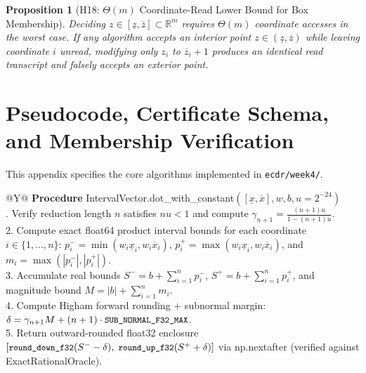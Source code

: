 \documentclass[11pt,oneside,a4paper]{report}
\newcommand{\R}{\mathbb{R}}
\newcommand{\abs}[1]{\left\lvert #1\right\rvert}
\newcommand{\code}[1]{{\small\upshape\ttfamily #1}}
\newtheorem{proposition}[definition]{Proposition}
\theoremstyle{remark}
\begin{document}
\begin{proposition}[\code{H18}: $\Theta(m)$ Coordinate-Read Lower Bound for Box Membership]
Deciding $z \in [\underline{z}, \overline{z}] \subset \R^m$ requires $\Theta(m)$ coordinate accesses in the worst case. If any algorithm accepts an interior point $z \in (\underline{z}, \overline{z})$ while leaving coordinate $i$ unread, modifying only $z_i$ to $\overline{z}_i + 1$ produces an identical read transcript and falsely accepts an exterior point.
\end{proposition}

\chapter{Pseudocode, Certificate Schema, and Membership Verification}
\label{app:algorithms}

This appendix specifies the core algorithms implemented in \nolinkurl{ecdr/week4/}.

\begin{table}[htbp]
\centering\small
\caption{Algorithm 1: Validated Higham \code{binary32} Dot-Product Enclosure (\nolinkurl{ecdr/week4/numerics.py})}
\label{tab:alg_higham}
\begin{tabularx}{\textwidth}{@{}Y@{}}
\toprule
\textbf{Procedure} \code{IntervalVector.dot\_with\_constant}$([\underline{x}, \overline{x}], w, b, u = 2^{-24})$ \\
. Verify reduction length $n$ satisfies $n u < 1$ and compute $\gamma_{n+1} = \frac{(n+1)u}{1 - (n+1)u}$. \\
2. Compute exact \code{float64} product interval bounds for each coordinate $i \in \{1,\dots,n\}$:
   $p_i^- = \min(w_i \underline{x}_i, w_i \overline{x}_i)$, $p_i^+ = \max(w_i \underline{x}_i, w_i \overline{x}_i)$, and $m_i = \max(\abs{p_i^-}, \abs{p_i^+})$. \\
3. Accumulate real bounds $S^- = b + \sum_{i=1}^n p_i^-$, $S^+ = b + \sum_{i=1}^n p_i^+$, and magnitude bound $M = \abs{b} + \sum_{i=1}^n m_i$. \\
4. Compute Higham forward rounding + subnormal margin:
   $\delta = \gamma_{n+1} M + (n+1)\cdot \text{\code{SUB\_NORMAL\_F32\_MAX}}$. \\
5. Return outward-rounded \code{float32} enclosure $[\text{\code{round\_down\_f32}}(S^- - \delta),\; \text{\code{round\_up\_f32}}(S^+ + \delta)]$ via \code{np.nextafter} (verified against \code{ExactRationalOracle}). \\
\bottomrule
\end{tabularx}
\end{table}
\end{document}
